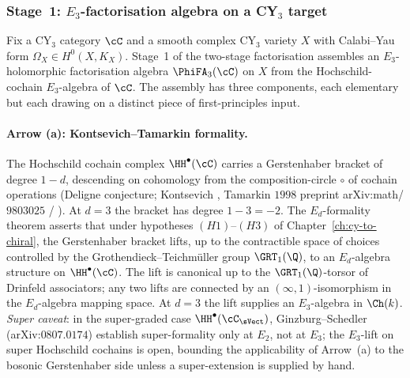 \subsubsection{Stage~1: $E_3$-factorisation algebra on a CY$_3$ target}
\label{subsec:fa-stage-one}

Fix a CY$_3$ category $\cC$ and a smooth complex CY$_3$ variety $X$
with Calabi--Yau form $\Omega_X \in H^0(X, K_X)$. Stage~1 of the
two-stage factorisation assembles an $E_3$-holomorphic factorisation
algebra $\PhiFA_3(\cC)$ on $X$ from the Hochschild-cochain $E_3$-algebra
of $\cC$. The assembly has three components, each elementary but
each drawing on a distinct piece of first-principles input.

\paragraph{Arrow (a): Kontsevich--Tamarkin formality.}
The Hochschild cochain complex $\HH^\bullet(\cC)$ carries a Gerstenhaber
bracket of degree $1 - d$, descending on cohomology from the
composition-circle $\circ$ of cochain operations
(Deligne conjecture; Kontsevich \cite{Kontsevich1997,Kontsevich1999},
Tamarkin $1998$ preprint arXiv:math/$9803025$ / \cite{Tamarkin2007}).
At $d = 3$ the bracket has degree $1 - 3 = -2$. The $E_d$-formality
theorem asserts that under hypotheses $(H1)$--$(H3)$ of
Chapter~\ref{ch:cy-to-chiral}, the Gerstenhaber bracket lifts, up to
the contractible space of choices controlled by the
Grothendieck--Teichm\"uller group $\GRT_1(\Q)$, to an $E_d$-algebra
structure on $\HH^\bullet(\cC)$. The lift is canonical up to the
$\GRT_1(\Q)$-torsor of Drinfeld associators; any two lifts are
connected by an $(\infty, 1)$-isomorphism in the $E_d$-algebra mapping
space. At $d = 3$ the lift supplies an $E_3$-algebra in $\Ch(k)$.
\emph{Super caveat}: in the super-graded case $\HH^\bullet(\cC_{\sVect})$,
Ginzburg--Schedler (arXiv:$0807.0174$) establish super-formality
only at $E_2$, not at $E_3$; the $E_3$-lift on super Hochschild cochains
is open, bounding the applicability of Arrow~(a) to the bosonic
Gerstenhaber side unless a super-extension is supplied by hand.

